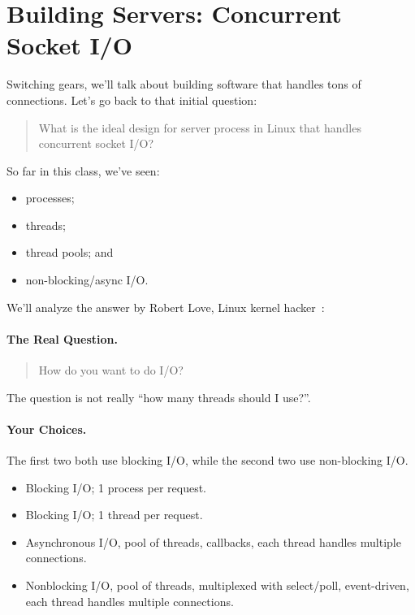 \section*{Building Servers: Concurrent Socket I/O}
Switching gears, we'll talk about building software that handles tons of connections. Let's go back to that initial question:

    \begin{quote}
      What is the ideal design for server process in Linux that handles concurrent socket I/O?
    \end{quote}

    So far in this class, we've seen:
    \begin{itemize}
    \item processes;
    \item threads; 
    \item thread pools; and
    \item non-blocking/async I/O.
    \end{itemize}

We'll analyze the answer by Robert Love, Linux kernel
hacker~\cite{gplus:concurrent}:

\paragraph{The Real Question.}

    \begin{quote}
      How do you want to do I/O?
    \end{quote}

The question is not really ``how many threads should I use?''.

\paragraph{Your Choices.} The first two both use blocking I/O, while the second two use
non-blocking I/O.
    \begin{itemize}
      \item Blocking I/O; 1 process per request.
      \item Blocking I/O; 1 thread per request.
      \item Asynchronous I/O, pool of threads, callbacks, each thread handles multiple connections.
      \item Nonblocking I/O, pool of threads, multiplexed with select/poll,
        event-driven, each thread handles multiple connections.
    \end{itemize}


